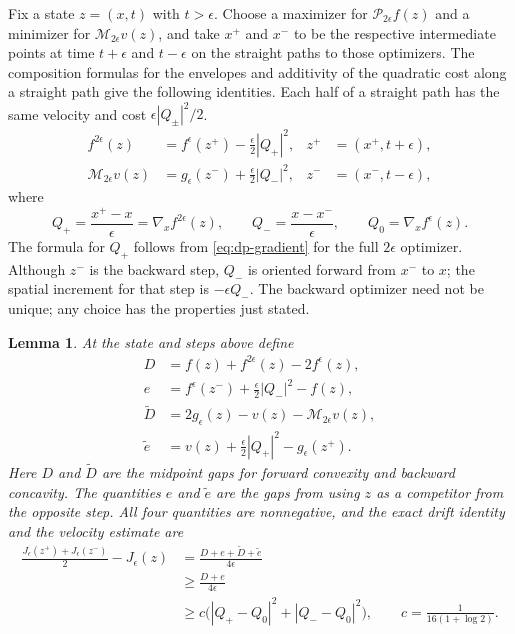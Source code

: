 \documentclass[11pt]{article}
\numberwithin{equation}{section}
\newtheorem{lemma}[theorem]{Lemma}
\theoremstyle{definition}
\theoremstyle{remark}
\newcommand{\Penv}{\mathcal{P}}
\newcommand{\Menv}{\mathcal{M}}
\begin{document}
Fix a state $z=(x,t)$ with $t>\epsilon$.  Choose a maximizer for
$\Penv_{2\epsilon}f(z)$ and a minimizer for $\Menv_{2\epsilon}v(z)$, and
take $x^+$ and $x^-$ to be the respective intermediate points at time
$t+\epsilon$ and $t-\epsilon$ on the straight paths to those optimizers.
The composition formulas for the envelopes and additivity of the quadratic
cost along a straight path give the following identities.  Each half of a
straight path has the same velocity and cost $\epsilon|Q_\pm|^2/2$.
\begin{equation}\label{eq:dp-step-choice}
\begin{aligned}
  f^{2\epsilon}(z)&=f^\epsilon(z^+)-\frac{\epsilon}{2}|Q_+|^2,
       &z^+&=(x^+,t+\epsilon),\\
  \Menv_{2\epsilon}v(z)&=g_\epsilon(z^-)+\frac{\epsilon}{2}|Q_-|^2,
       &z^-&=(x^-,t-\epsilon),
\end{aligned}
\end{equation}
where
\begin{equation}\label{eq:dp-velocities}
  Q_+=\frac{x^+-x}{\epsilon}=\nabla_x f^{2\epsilon}(z),\qquad
  Q_-=\frac{x-x^-}{\epsilon},\qquad Q_0=\nabla_x f^\epsilon(z).
\end{equation}
The formula for $Q_+$ follows from \eqref{eq:dp-gradient} for the full
$2\epsilon$ optimizer.  Although $z^-$ is the backward step, $Q_-$ is
oriented forward from $x^-$ to $x$; the spatial increment for that step is
$-\epsilon Q_-$.  The backward optimizer need not be unique; any choice has
the properties just stated.

\begin{lemma}\label{lem:dp-drift}
At the state and steps above define
\begin{align*}
  D&=f(z)+f^{2\epsilon}(z)-2f^\epsilon(z),\\
  e&=f^\epsilon(z^-)+\frac{\epsilon}{2}|Q_-|^2-f(z),\\
  \widetilde D&=2g_\epsilon(z)-v(z)-\Menv_{2\epsilon}v(z),\\
  \widetilde e&=v(z)+\frac{\epsilon}{2}|Q_+|^2-g_\epsilon(z^+).
\end{align*}
Here $D$ and $\widetilde D$ are the midpoint gaps for forward convexity and
backward concavity.  The quantities $e$ and $\widetilde e$ are the gaps from
using $z$ as a competitor from the opposite step.
All four quantities are nonnegative, and the exact drift identity and the
velocity estimate are
\begin{equation}\label{eq:dp-drift}
\begin{split}
  \frac{J_\epsilon(z^+)+J_\epsilon(z^-)}{2}-J_\epsilon(z)
  &=\frac{D+e+\widetilde D+\widetilde e}{4\epsilon}\\
  &\ge\frac{D+e}{4\epsilon}\\
  &\ge c\bigl(|Q_+-Q_0|^2+|Q_--Q_0|^2\bigr),
  \qquad c=\frac{1}{16(1+\log2)}.
\end{split}
\end{equation}
\end{lemma}
\end{document}
